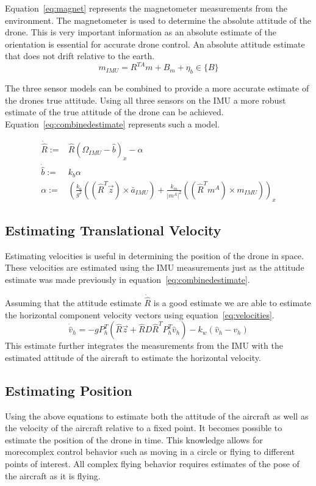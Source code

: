 \documentclass[conference]{IEEEtran}
\begin{document}
Equation~\ref{eq:magnet} represents the magnetometer measurements from the environment. The magnetometer is used to determine the absolute attitude of the drone. This is very important information as an absolute estimate of the orientation is essential for accurate drone control. An absolute attitude estimate that does not drift relative to the earth.
\begin{equation}
\label{eq:magnet}
m_{IMU} = R^{TA} m + B_m + \eta_b \in \{B\}
\end{equation}

The three sensor models can be combined to provide a more accurate estimate of the drones true attitude. Using all three sensors on the IMU a more robust estimate of the true attitude of the drone can be achieved. Equation~\ref{eq:combinedestimate} represents such a model.

\begin{equation}
\label{eq:combinedestimate}
\begin{split}
\dot{\hat{R}} :=& \hat{R} \left (\Omega_{IMU} - \hat{b} \right )_x - \alpha\\
\dot{\hat{b}} :=& k_b \alpha\\
\alpha :=& \left (\frac{k_a}{g^2} ((\hat{R}^T \vec{z}) \times \bar{a}_{IMU}) + \frac{k_m}{|m^A|^2} ((\hat{R}^T m^A) \times m_{IMU}) \right )_x
\end{split}
\end{equation}

\subsection{Estimating Translational Velocity}
Estimating velocities is useful in determining the position of the drone in space. These velocities are estimated using the IMU measurements just as the attitude estimate was made previously in equation~\ref{eq:combinedestimate}.

Assuming that the attitude estimate $\dot{\hat{R}}$ is a good estimate we are able to estimate the horizontal component velocity vectors using equation~\ref{eq:velocities}.
\begin{equation}
\label{eq:velocities}
\dot{\hat{v}}_h = -g P_h^T \left ( \hat{R} \vec{z} + \hat{R} D\hat{R}^T P_h^T \hat{v}_h \right ) - k_w (\hat{v}_h - v_h)
\end{equation}
This estimate further integrates the measurements from the IMU with the estimated attitude of the aircraft to estimate the horizontal velocity.

\subsection{Estimating Position}
Using the above equations to estimate both the attitude of the aircraft as well as the velocity of the aircraft relative to a fixed point. It becomes possible to estimate the position of the drone in time. This knowledge allows for morecomplex control behavior such as moving in a circle or flying to different points of interest. All complex flying behavior requires estimates of the pose of the aircraft as it is flying.
\end{document}
